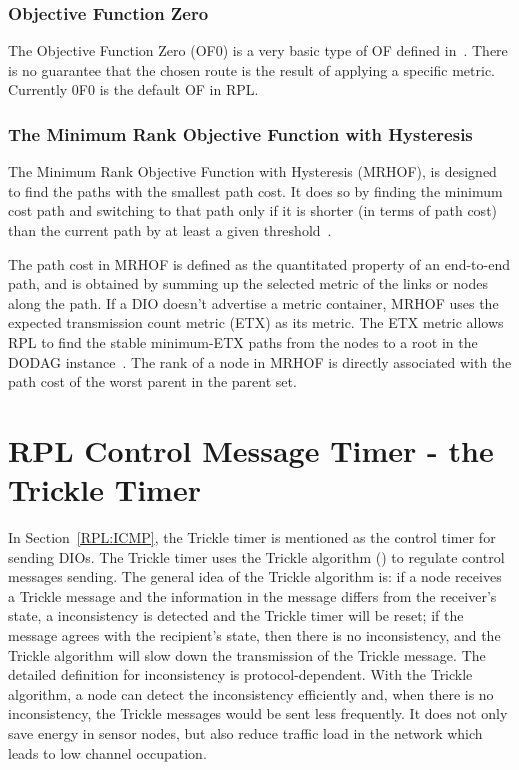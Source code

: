 \subsubsection{Objective Function Zero}
\label{RPL:OF0}
The Objective Function Zero (OF0) is a very basic type of OF defined in~\cite{draft-ietf-roll-of0-20}. There is no guarantee that the chosen route is the result of applying a specific metric. Currently 0F0 is the default OF in RPL.
 
\subsubsection{The Minimum Rank Objective Function with Hysteresis}
\label{RPL:MRHOF}
The Minimum Rank Objective Function with Hysteresis (MRHOF)\@, is designed to find the paths with the smallest path cost. It does so by finding the minimum cost path and switching to that path only if it is shorter (in terms of path cost) than the current path by at least a given threshold~\cite{MRHOF}. 

The path cost in MRHOF is defined as the quantitated property of an end-to-end path, and is obtained by summing up the selected metric of the links or nodes along the path. If a DIO doesn't advertise a metric container, MRHOF uses the expected transmission count metric (ETX) as its metric. The ETX metric allows RPL to find the stable minimum-ETX paths from the nodes to a root in the DODAG instance~\cite{MRHOF}. The rank of a node in MRHOF is directly associated with the path cost of the worst parent in the parent set.

\section{RPL Control Message Timer - the Trickle Timer}
\label{Trickle}
In Section~\ref{RPL:ICMP}, the Trickle timer is mentioned as the control timer for sending DIOs. The Trickle timer uses the Trickle algorithm (\cite{RFC 6206}) to regulate control messages sending. The general idea of the Trickle algorithm is: if a node receives a Trickle message and the information in the message differs from the receiver's state, a inconsistency is detected and the Trickle timer will be reset; if the message agrees with the recipient's state, then there is no inconsistency, and the Trickle algorithm will slow down the transmission of the Trickle message. The detailed definition for inconsistency is protocol-dependent. With the Trickle algorithm, a node can detect the inconsistency efficiently and, when there is no inconsistency, the Trickle messages would be sent less frequently. It does not only save energy in sensor nodes, but also reduce traffic load in the network which leads to low channel occupation. 


